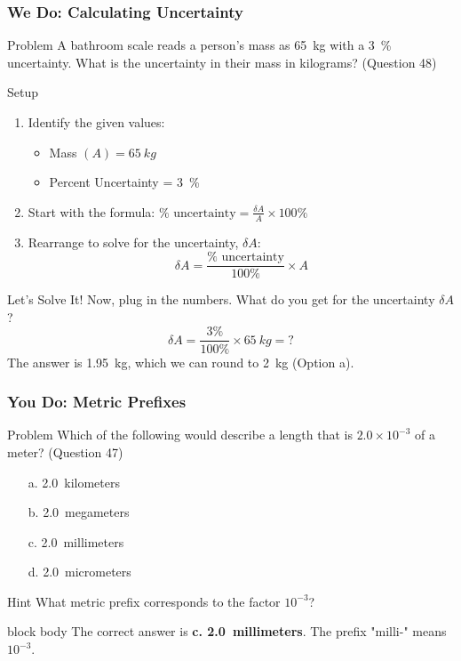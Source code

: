 \documentclass{beamer}
\begin{document}
\begin{frame}
    \frametitle{We Do: Calculating Uncertainty}
    \begin{alertblock}{Problem}
        A bathroom scale reads a person's mass as \SI{65}{kg} with a \SI{3}{\percent} uncertainty. What is the uncertainty in their mass in kilograms? (Question 48)
    \end{alertblock}
    \begin{block}{Setup}
        \begin{enumerate}
            \item Identify the given values:
            \begin{itemize}
                \item Mass \( (A) = \SI{65}{kg} \)
                \item Percent Uncertainty = \SI{3}{\percent}
            \end{itemize}
            \item Start with the formula: \( \% \text{ uncertainty} = \frac{\delta A}{A} \times 100\% \)
            \item Rearrange to solve for the uncertainty, \(\delta A\):
            \[ \delta A = \frac{\% \text{ uncertainty}}{100\%} \times A \]
        \end{enumerate}
    \end{block}
    \begin{exampleblock}{Let's Solve It!}
        Now, plug in the numbers. What do you get for the uncertainty \(\delta A\)?
        \[ \delta A = \frac{3\%}{100\%} \times \SI{65}{kg} = \textbf{?} \]
        \pause
        The answer is \SI{1.95}{kg}, which we can round to \SI{2}{kg} (Option a).
    \end{exampleblock}
\end{frame}

\begin{frame}
    \frametitle{You Do: Metric Prefixes}
    \begin{alertblock}{Problem}
        Which of the following would describe a length that is \(2.0 \times 10^{-3}\) of a meter? (Question 47)
    \end{alertblock}
    \begin{itemize}
        \item[a.] \SI{2.0}{kilometers}
        \item[b.] \SI{2.0}{megameters}
        \item[c.] \SI{2.0}{millimeters}
        \item[d.] \SI{2.0}{micrometers}
    \end{itemize}
    \pause
    \begin{block}{Hint}
        What metric prefix corresponds to the factor \(10^{-3}\)?
    \end{block}
    \pause
    \begin{beamercolorbox}[rounded=true,center,wd=\textwidth]{block body}
        The correct answer is \textbf{c. \SI{2.0}{millimeters}}. The prefix "milli-" means \(10^{-3}\).
    \end{beamercolorbox}
\end{frame}
\end{document}
